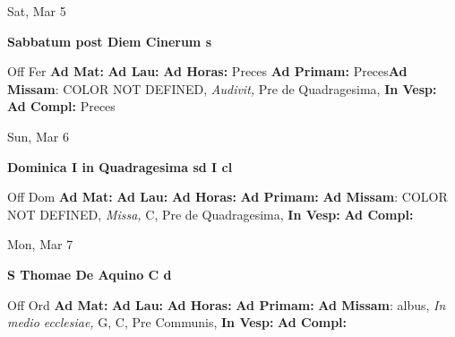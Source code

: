 \documentclass[10pt]{memoir}
\begin{document}
\begin{center}
\begin{minipage}{3.5in}
\vspace{2em}
\begin{center}Sat, Mar 5
\end{center}
\textbf{ \large Sabbatum post Diem Cinerum
\textnormal{\normalsize s}}

\begin{justify}Off Fer
\textbf{Ad Mat: }
\textbf{Ad Lau: }
\textbf{Ad Horas: }Preces
\textbf{Ad Primam: }Preces\textbf{Ad Missam}: COLOR NOT DEFINED, \textit{Audivit,} Pre de Quadragesima, 
\textbf{In Vesp: }
\textbf{Ad Compl: }Preces
\end{justify}
\end{minipage}
\end{center}

\begin{center}
\begin{minipage}{3.5in}
\vspace{2em}
\begin{center}Sun, Mar 6
\end{center}
\textbf{ \large Dominica I in Quadragesima
\textnormal{\normalsize sd I cl}}

\begin{justify}Off Dom
\textbf{Ad Mat: }
\textbf{Ad Lau: }
\textbf{Ad Horas: }
\textbf{Ad Primam: }\textbf{Ad Missam}: COLOR NOT DEFINED, \textit{Missa,} C, Pre de Quadragesima, 
\textbf{In Vesp: }
\textbf{Ad Compl: }
\end{justify}
\end{minipage}
\end{center}

\begin{center}
\begin{minipage}{3.5in}
\vspace{2em}
\begin{center}Mon, Mar 7
\end{center}
\textbf{ \large S Thomae De Aquino C
\textnormal{\normalsize d}}

\begin{justify}Off Ord
\textbf{Ad Mat: }
\textbf{Ad Lau: }
\textbf{Ad Horas: }
\textbf{Ad Primam: }\textbf{Ad Missam}: albus, \textit{In medio ecclesiae,} G, C, Pre Communis, 
\textbf{In Vesp: }
\textbf{Ad Compl: }
\end{justify}
\end{minipage}
\end{center}
\end{document}
